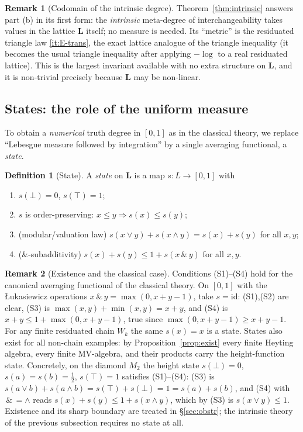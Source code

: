 \documentclass{amsart}
\theoremstyle{definition}
\newtheorem{definition}{Definition}
\newtheorem{remark}{Remark}
\theoremstyle{plain}
\newcommand{\bL}{\mathbf{L}}
\newcommand{\odotop}{\,\&\,}
\newcommand{\Top}{\top}
\newcommand{\Bot}{\bot}
\begin{document}
\begin{remark}[Codomain of the intrinsic degree]\label{rem:intr-codomain}
Theorem~\ref{thm:intrinsic} answers part (b) in its first form: the
\emph{intrinsic} meta-degree of interchangeability takes values in the lattice
$\bL$ itself; no measure is needed.  Its ``metric'' is the residuated triangle law
\eqref{it:E-trans}, the exact lattice analogue of the triangle inequality (it
becomes the usual triangle inequality after applying $-\log$ to a real residuated
lattice).  This is the largest invariant available with no extra structure on
$\bL$, and it is non-trivial precisely because $\bL$ may be non-linear.
\end{remark}

\subsection{States: the role of the uniform measure}

To obtain a \emph{numerical} truth degree in $[0,1]$ as in the classical theory,
we replace ``Lebesgue measure followed by integration'' by a single averaging
functional, a \emph{state}.

\begin{definition}[State]\label{def:state}
A \emph{state} on $\bL$ is a map $s:L\to[0,1]$ with
\begin{enumerate}
\item[(S1)] $s(\Bot)=0$, $s(\Top)=1$;
\item[(S2)] $s$ is order-preserving: $x\le y\Rightarrow s(x)\le s(y)$;
\item[(S3)] (modular/valuation law) $s(x\vee y)+s(x\wedge y)=s(x)+s(y)$ for all $x,y$;
\item[(S4)] ($\&$-subadditivity) $s(x)+s(y)\le 1+s(x\odotop y)$ for all $x,y$.
\end{enumerate}
\end{definition}

\begin{remark}[Existence and the classical case]\label{rem:state-exist}
Conditions (S1)--(S4) hold for the canonical averaging functional of the
classical theory.  On $[0,1]$ with the \L ukasiewicz operations
$x\odotop y=\max(0,x+y-1)$, take $s=\mathrm{id}$: (S1),(S2) are clear,
(S3) is $\max(x,y)+\min(x,y)=x+y$, and (S4) is $x+y\le 1+\max(0,x+y-1)$, true
since $\max(0,x+y-1)\ge x+y-1$.  For any finite residuated chain $W_k$ the same
$s(x)=x$ is a state.  States also exist for all non-chain examples: by
Proposition~\ref{prop:exist} every finite Heyting algebra, every finite
MV-algebra, and their products carry the height-function state.  Concretely, on
the diamond $M_2$ the height state $s(\Bot)=0$, $s(a)=s(b)=\tfrac12$,
$s(\Top)=1$ satisfies (S1)--(S4): (S3) is
$s(a\vee b)+s(a\wedge b)=s(\Top)+s(\Bot)=1=s(a)+s(b)$, and (S4) with
$\odotop=\wedge$ reads $s(x)+s(y)\le 1+s(x\wedge y)$, which by (S3) is
$s(x\vee y)\le1$.  Existence and its sharp boundary are treated in
\S\ref{sec:obstr}; the intrinsic theory of the previous subsection requires no
state at all.
\end{remark}
\end{document}
